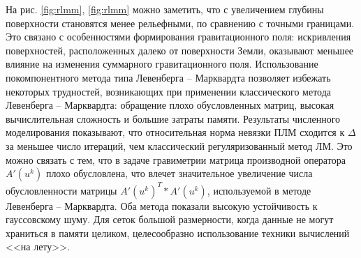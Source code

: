 На рис. \ref{fig:rlmm}, \ref{fig:rlmm} можно заметить, что с увеличением глубины поверхности становятся менее рельефными, по сравнению с точными границами. Это связано с особенностями формирования гравитационного поля: искривления поверхностей, расположенных далеко от поверхности Земли, оказывают меньшее влияние на изменения суммарного гравитационного поля. Использование покомпонентного метода типа Левенберга -- Марквардта позволяет избежать некоторых трудностей, возникающих при применении классического метода Левенберга -- Марквардта: обращение плохо обусловленных матриц, высокая вычислительная сложность и большие затраты памяти. Результаты численного моделирования показывают, что относительная норма невязки ПЛМ сходится к $\Delta$ за меньшее число итераций, чем классический регуляризованный метод ЛМ. Это можно связать с тем, что в задаче гравиметрии матрица производной оператора $A'(u^k)$ плохо обусловлена, что влечет значительное увеличение числа обусловленности матрицы $A'(u^k)^T*A'(u^k)$, используемой в методе Левенберга -- Марквардта. Оба метода показали высокую устойчивость к гауссовскому шуму. Для сеток большой размерности, когда данные не могут храниться в памяти целиком, целесообразно использование техники вычислений <<на лету>>.